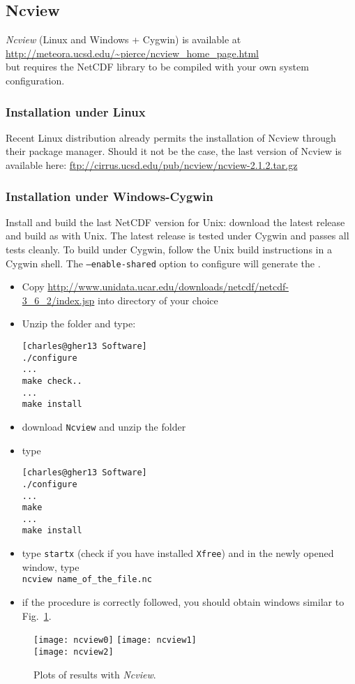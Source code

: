 \subsection{Ncview}

\textsl{Ncview} (Linux and Windows + Cygwin) is available at\\
\url{http://meteora.ucsd.edu/~pierce/ncview_home_page.html}\\
but requires the NetCDF library to be compiled with your own system configuration.

\subsubsection{Installation under Linux}

Recent Linux distribution already permits the installation of Ncview through their package manager. Should it not be the case, the last version of Ncview is available here: \url{ftp://cirrus.ucsd.edu/pub/ncview/ncview-2.1.2.tar.gz}

\subsubsection{Installation under Windows-Cygwin}

Install and build the last NetCDF version for Unix: download the latest release and build as with Unix. The latest release is tested under Cygwin and passes all tests cleanly. To build under Cygwin, follow the Unix build instructions in a Cygwin shell. The \texttt{--enable-shared} option to configure will generate the . 


\begin{itemize}
\item Copy \url{http://www.unidata.ucar.edu/downloads/netcdf/netcdf-3_6_2/index.jsp}  into directory of your choice
\item Unzip the folder  and type:
\begin{lstlisting}[style=Bash]
[charles@gher13 Software]
./configure
...
make check..
...
make install
\end{lstlisting}

\item download \texttt{Ncview} and unzip the folder
\item type\\ 
\begin{lstlisting}[style=Bash]
[charles@gher13 Software]
./configure
...
make 
...
make install
\end{lstlisting}

\item type \texttt{startx} (check if you have installed \texttt{Xfree}) and in the newly opened window, type\\
\texttt{ncview name\_of\_the\_file.nc}

\item if the procedure is correctly followed, you should obtain windows similar to Fig.~\ref{fig:ncview}.
\end{itemize}

\begin{figure}[htpb]
\centering
\texttt{[image: ncview0]}\hspace{.5cm} \texttt{[image: ncview1]} \\
\vspace{.5cm}
\texttt{[image: ncview2]} \caption{Plots of results with \textsl{Ncview}.\label{fig:ncview}}
\end{figure}
